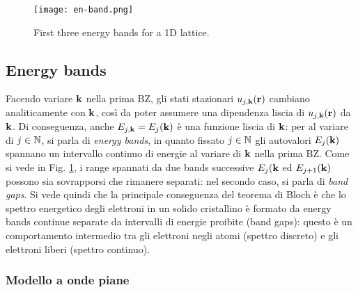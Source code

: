 \begin{figure}[!b]
	\centering
	\texttt{[image: en-band.png]}
	\caption{First three energy bands for a 1D lattice.}
	\label{en-band}
\end{figure}

\subsection{Energy bands}

Facendo variare $ \mathbf{k} $ nella prima BZ, gli stati stazionari $ u_{j,\mathbf{k}}(\mathbf{r}) $ cambiano analiticamente con $ \mathbf{k} $, così da poter assumere una dipendenza liscia di $ u_{j,\mathbf{k}}(\mathbf{r}) $ da $ \mathbf{k} $. Di conseguenza, anche $ E_{j,\mathbf{k}} = E_j(\mathbf{k}) $ è una funzione liscia di $ \mathbf{k} $: per al variare di $ j \in \mathbb{N} $, si parla di \textit{energy bands}, in quanto fissato $ j \in \mathbb{N} $ gli autovalori $ E_j(\mathbf{k}) $ spannano un intervallo continuo di energie al variare di $ \mathbf{k} $ nella prima BZ. Come si vede in Fig. \ref{en-band}, i range spannati da due bands successive $ E_j(\mathbf{k} $ ed $ E_{j+1}(\mathbf{k}) $ possono sia sovrapporsi che rimanere separati: nel secondo caso, si parla di \textit{band gaps}. Si vede quindi che la principale conseguenza del teorema di Bloch è che lo spettro energetico degli elettroni in un solido cristallino è formato da energy bands continue separate da intervalli di energie proibite (band gaps): questo è un comportamento intermedio tra gli elettroni negli atomi (spettro discreto) e gli elettroni liberi (spettro continuo).

\subsubsection{Modello a onde piane}


